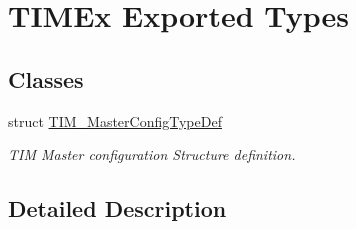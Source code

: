 \hypertarget{group___t_i_m_ex___exported___types}{\section{T\-I\-M\-Ex Exported Types}
\label{group___t_i_m_ex___exported___types}
}
\subsection*{Classes}
\begin{DoxyCompactItemize}
\item 
struct \hyperlink{struct_t_i_m___master_config_type_def}{T\-I\-M\-\_\-\-Master\-Config\-Type\-Def}
\begin{DoxyCompactList}\small\item\em T\-I\-M Master configuration Structure definition. \end{DoxyCompactList}\end{DoxyCompactItemize}


\subsection{Detailed Description}
